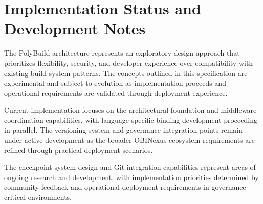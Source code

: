 \section*{Implementation Status and Development Notes}

The PolyBuild architecture represents an exploratory design approach that prioritizes flexibility, security, and developer experience over compatibility with existing build system patterns. The concepts outlined in this specification are experimental and subject to evolution as implementation proceeds and operational requirements are validated through deployment experience.

Current implementation focuses on the architectural foundation and middleware coordination capabilities, with language-specific binding development proceeding in parallel. The versioning system and governance integration points remain under active development as the broader OBINexus ecosystem requirements are refined through practical deployment scenarios.

The checkpoint system design and Git integration capabilities represent areas of ongoing research and development, with implementation priorities determined by community feedback and operational deployment requirements in governance-critical environments.